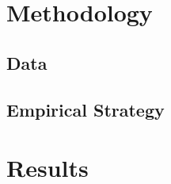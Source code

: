 \documentclass[11pt,a4paper]{article}\usepackage[]{graphicx}\usepackage[]{xcolor}
\begin{document}
\section{Methodology}

\subsection{Data}

\subsection{Empirical Strategy}

\section{Results}
\end{document}
